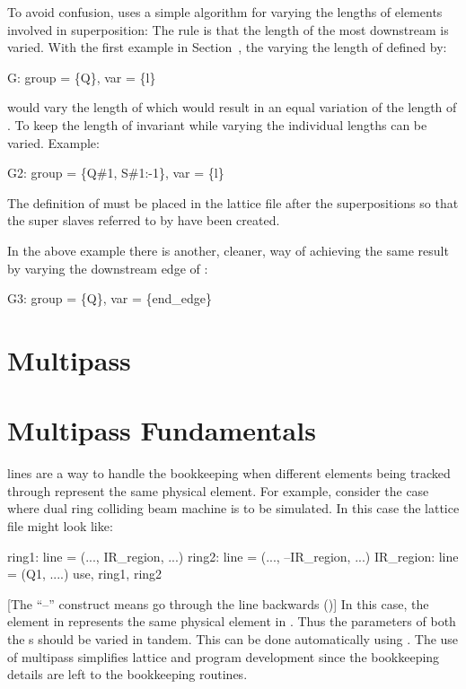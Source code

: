 To avoid confusion, \bmad uses a simple algorithm for varying the lengths of elements involved in
superposition: The rule is that the length of the most downstream  is varied.  With
the first example in Section~, the   varying the length of 
defined by:
\begin{example}
  G: group = \{Q\}, var = \{l\}
\end{example}
would vary the length of  which would result in an equal variation of the length of
. To keep the length of  invariant while varying  the individual 
lengths can be varied. Example:
\begin{example}
  G2: group = \{Q{\#}1, S{\#}1:-1\}, var = \{l\}
\end{example}
The definition of  must be placed in the lattice file after the superpositions so that the
super slaves referred to by  have been created.

In the above example there is another, cleaner, way of achieving the same result by varying the
downstream edge of :
\begin{example}
  G3: group = \{Q\}, var = \{end_edge\}
\end{example}

\section{Multipass}
\label{c:multipass}

\section{Multipass Fundamentals}
\label{c:multipass.fund}

 lines are a way to handle the bookkeeping when different elements being tracked
through represent the same physical element. For example, consider the case where dual ring colliding
beam machine is to be simulated. In this case the lattice file might look like:
\begin{example}
  ring1: line = (..., IR_region, ...)
  ring2: line = (..., --IR_region, ...)
  IR_region: line = (Q1, ....)
  use, ring1, ring2
\end{example}
[The ``--'' construct means go through the line backwards ()] In this case, the
 element in  represents the same physical element in . Thus the parameters
of both the s should be varied in tandem. This can be done automatically using .
The use of multipass simplifies lattice and program development since the bookkeeping details are left
to the \bmad bookkeeping routines.

